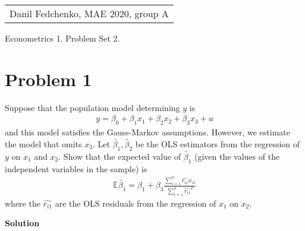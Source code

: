 \documentclass[a4paper]{article}
\newcommand{\expect}{\mathbb{E}}
\begin{document}
	\begin{flushright}
	\begin{tabular}{r}
		Danil Fedchenko, MAE 2020, group A \\
	\end{tabular}
\end{flushright}


\begin{center}
	Econometrics 1. Problem Set 2.
\end{center}
\section*{Problem 1}
Suppose that the population model determining $y$ is
\begin{align*}
y = \beta_0 + \beta_1 x_1 + \beta_2x_2 + \beta_3x_3 + u
\end{align*}
and this model satisfies the Gauss-Markov assumptions. However, we estimate the model that
omits $x_3$. Let $\tilde{\beta_1}, \tilde{\beta_2}$ be the OLS estimators from the regression of $y$ on $x_1$ and $x_2$. Show
that the expected value of $\tilde{\beta_1}$ (given the values of the independent variables in the sample) is
\begin{align*}
\expect \tilde{\beta_1} = \beta_1 + \beta_3 \frac{\sum_{i=1}^n \hat{r_{i1}}x_{i3}}{\sum_{i=1}^n \hat{r_{i1}}^2}
\end{align*}
where the $\hat{r_{i1}}$ are the OLS residuals from the regression of $x_1$ on $x_2$.



\textbf{Solution}
\end{document}
